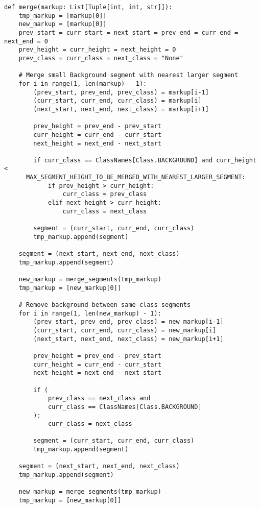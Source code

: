 \begin{lstlisting}[caption={Функция создания объединенной разметки}, label={lst:merged}]
def merge(markup: List[Tuple[int, int, str]]):
    tmp_markup = [markup[0]]
    new_markup = [markup[0]]
    prev_start = curr_start = next_start = prev_end = curr_end = next_end = 0
    prev_height = curr_height = next_height = 0
    prev_class = curr_class = next_class = "None"
    
    # Merge small Background segment with nearest larger segment
    for i in range(1, len(markup) - 1):
        (prev_start, prev_end, prev_class) = markup[i-1]
        (curr_start, curr_end, curr_class) = markup[i]
        (next_start, next_end, next_class) = markup[i+1]

        prev_height = prev_end - prev_start
        curr_height = curr_end - curr_start
        next_height = next_end - next_start

        if curr_class == ClassNames[Class.BACKGROUND] and curr_height <
      MAX_SEGMENT_HEIGHT_TO_BE_MERGED_WITH_NEAREST_LARGER_SEGMENT:
            if prev_height > curr_height:
                curr_class = prev_class
            elif next_height > curr_height:
                curr_class = next_class

        segment = (curr_start, curr_end, curr_class)
        tmp_markup.append(segment)

    segment = (next_start, next_end, next_class)
    tmp_markup.append(segment)

    new_markup = merge_segments(tmp_markup)
    tmp_markup = [new_markup[0]]

    # Remove background between same-class segments
    for i in range(1, len(new_markup) - 1):
        (prev_start, prev_end, prev_class) = new_markup[i-1]
        (curr_start, curr_end, curr_class) = new_markup[i]
        (next_start, next_end, next_class) = new_markup[i+1]

        prev_height = prev_end - prev_start
        curr_height = curr_end - curr_start
        next_height = next_end - next_start

        if (
            prev_class == next_class and
            curr_class == ClassNames[Class.BACKGROUND]
        ):
            curr_class = next_class

        segment = (curr_start, curr_end, curr_class)
        tmp_markup.append(segment)

    segment = (next_start, next_end, next_class)
    tmp_markup.append(segment)

    new_markup = merge_segments(tmp_markup)
    tmp_markup = [new_markup[0]]


\end{lstlisting}
